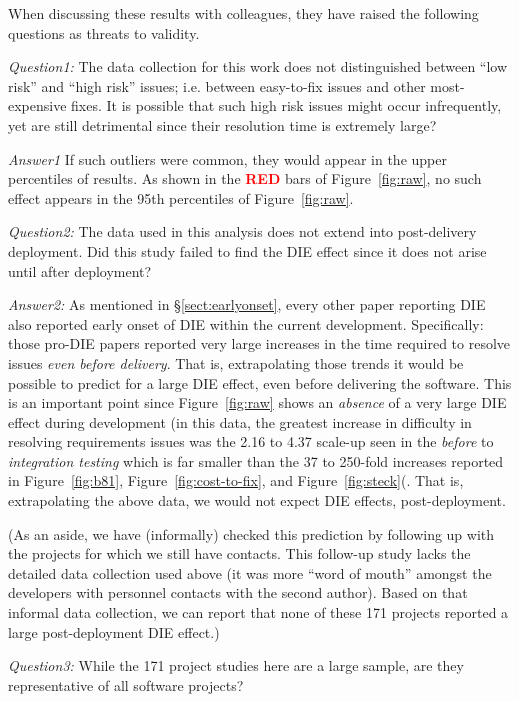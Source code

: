 \documentclass[smallcondesed]{svjour3}
\newcommand{\tion}[1]{\S\ref{sect:#1}}
\newcommand{\fig}[1]{Figure~\ref{fig:#1}}
\begin{document}
When discussing these results with colleagues, they have raised the following questions as threats to validity.

 
{\em Question1:} The data collection   for this work does not 
distinguished between ``low risk'' and ``high risk''
issues; i.e. between easy-to-fix issues and other most-expensive fixes. 
It is possible that such high risk issues might occur infrequently,  yet are still detrimental
since  their resolution time is extremely large?

{\em Answer1} If such outliers were common, they would appear in the upper percentiles of results. 
As shown in the \textcolor{red}{{\bf RED}} bars of \fig{raw}, no such effect appears in the 95th percentiles of \fig{raw}.  



 {\em Question2:}
The data used in this analysis does not extend into post-delivery deployment. 
Did this study failed to find the DIE effect since it does not arise until after deployment?
 

{\em Answer2:} 
As mentioned in \tion{earlyonset}, every other
paper reporting DIE also reported  early onset of DIE
within the current development. Specifically: those pro-DIE papers reported very large
increases in the time required to resolve issues {\em even before delivery}. That is, extrapolating those
trends it would be possible to predict for a large DIE effect, even before delivering the software.
This is an important point since  Figure~\ref{fig:raw} shows an {\em absence}
of a very large DIE   effect during development
(in this data, the greatest increase in difficulty in resolving requirements issues was the 2.16 to 4.37
scale-up seen in the {\em before} to {\em integration testing} 
which is far smaller than the 37 to 250-fold increases reported in \fig{b81}, \fig{cost-to-fix},
and \fig{steck}(.  
That is, extrapolating the above data, we would not expect DIE effects, post-deployment. 

(As an aside, we have (informally) checked this prediction by following up with the projects for which we
still have contacts. This follow-up study lacks the detailed data collection used above (it was more ``word of mouth''
amongst the developers with personnel contacts with the second author). Based
on that informal data collection, we can report that none of these 171  projects reported
a  large post-deployment  
DIE effect.)
 
 {\em Question3:}
 While the 171 project studies here are a large sample, are they representative of all software projects? 
 
\end{document}
